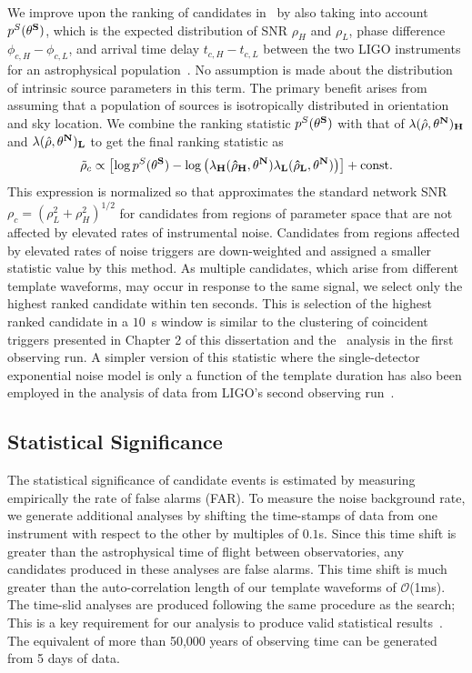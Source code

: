 We improve upon the ranking of candidates in~\cite{Abbott:2016ymx,TheLIGOScientific:2016pea} by also taking into account $p^S(\bf{\theta}^S)$, which is the expected distribution of SNR $\rho_H$ and $\rho_L$, phase difference $\phi_{c, H} - \phi_{c, L}$, and arrival time delay $t_{c,H} - t_{c,L}$ between the two LIGO instruments for an astrophysical population~\citep{Nitz:2017svb}. No assumption is made about the distribution of intrinsic source parameters  in this term. The primary benefit arises from assuming that a population of sources is isotropically distributed in orientation and sky location. We combine the ranking statistic $p^S(\bf{\theta}^S)$ with that of $\lambda(\hat{\rho}, \bf{\theta}^N)_{H}$ and $\lambda(\hat{\rho}, \bf{\theta}^N)_{L}$ to get the final ranking statistic \rankingstat{} as
\begin{equation}\label{eq:genstat}
  \tilde{\rho}_c \propto \left[ \log p^S(\bf{\theta}^S) - \log \left(\lambda_H(\hat{\rho}_{H},\bf{\theta}^N) \lambda_L(\hat{\rho}_{L}, \bf{\theta}^N)\right) 
  \right] + \mathrm{const.}
\end{equation}
This expression is normalized so that \rankingstat{} approximates the standard network SNR $\rho_c = (\rho_L^2 + \rho_H^2)^{1/2}$ for candidates from regions of parameter space that are not affected by elevated rates of instrumental noise. Candidates from regions affected by elevated rates of noise triggers are down-weighted and assigned a smaller statistic value by this method. As multiple candidates, which arise from different template waveforms, may occur in response to the same signal, we select only the highest ranked candidate within ten seconds. This is selection of the highest ranked candidate in a $10$~s window is similar to the clustering of coincident triggers presented in Chapter 2 of this dissertation and the \pycbc{}\ analysis in the first observing run. A simpler version of this statistic where the single-detector exponential noise model is only a function of the template duration has also been employed in the analysis of data from LIGO's second observing run~\citep{GW170104, GW170814, Abbott:2017gyy}.

\subsection{Statistical Significance}

The statistical significance of candidate events is estimated by measuring empirically the rate of false alarms (FAR). To measure the noise background rate, we generate additional analyses by shifting the time-stamps of data from one instrument with respect to the other by multiples of $0.1$s. Since this time shift is greater than the astrophysical time of flight between observatories, any candidates produced in these analyses are false alarms. This time shift is much greater than the auto-correlation length of our template waveforms of $\mathcal{O}$(1ms). The time-slid analyses are produced following the same procedure as the search; This is a key requirement for our analysis to produce valid statistical results~\citep{TheLIGOScientific:2016qqj}. The equivalent of more than 50,000 years of observing time can be generated from 5 days of data.

